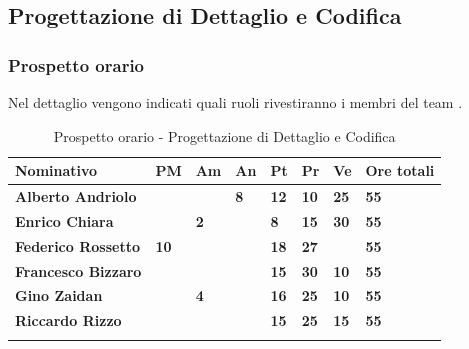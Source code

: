 \subsection{Progettazione di Dettaglio e Codifica}
\subsubsection{Prospetto orario}
Nel dettaglio vengono indicati quali ruoli rivestiranno i membri del team 
\GRUPPO.
\begin{center}
	\def\arraystretch{1.6}
	\bgroup
	\begin{longtable}{| p{4cm} | p{1cm} | p{1cm} | p{1cm} | p{1cm}| p{1cm} | 
			p{1cm} | p{1.7cm}|}
		\hline
		\textbf{Nominativo} & \textbf{PM} & \textbf{Am} & \textbf{An} & 
		\textbf{Pt} & \textbf{Pr} & \textbf{Ve} & \textbf{Ore totali}\\ 
		
		\hline \hline  
		
		\textbf{Alberto Andriolo} & \textbf{} & \textbf{} & \textbf{8} & 
		\textbf{12} & \textbf{10} & \textbf{25} & \textbf{55}\\ 
		\hline 
		
		\textbf{Enrico Chiara} & \textbf{} & \textbf{2} & \textbf{} & 
		\textbf{8} & \textbf{15} & \textbf{30} & \textbf{55}\\ 
		\hline 
		
		\textbf{Federico Rossetto} & \textbf{10} & \textbf{} & \textbf{} & 
		\textbf{18} & \textbf{27} & \textbf{} & \textbf{55}\\ 
		\hline 
		
		\textbf{Francesco Bizzaro} & \textbf{} & \textbf{} & \textbf{} & 
		\textbf{15} & \textbf{30} & \textbf{10} & \textbf{55}\\ 
		\hline 
		
		\textbf{Gino Zaidan} & \textbf{} & \textbf{4} & \textbf{} & 
		\textbf{16} & \textbf{25} & \textbf{10} & \textbf{55}\\ 
		\hline 
		
		\textbf{Riccardo Rizzo} & \textbf{} & \textbf{} & \textbf{} & 
		\textbf{15} & \textbf{25} & \textbf{15} & \textbf{55}\\ 
		\hline 
		
		\hline 
		
		\caption{Prospetto orario - Progettazione di Dettaglio e Codifica}
	\end{longtable}
	\egroup
\end{center}
